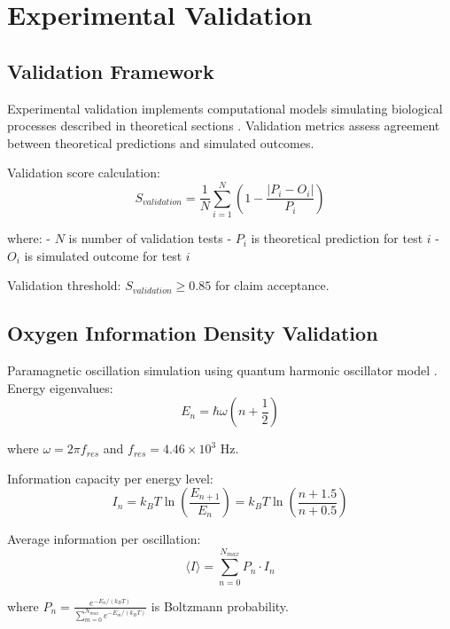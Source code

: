 
\section{Experimental Validation}

\subsection{Validation Framework}

Experimental validation implements computational models simulating biological processes described in theoretical sections \cite{saltelli2008global}. Validation metrics assess agreement between theoretical predictions and simulated outcomes.

Validation score calculation:
\begin{equation}
S_{validation} = \frac{1}{N} \sum_{i=1}^N \left(1 - \frac{|P_i - O_i|}{P_i}\right)
\end{equation}

where:
- $N$ is number of validation tests
- $P_i$ is theoretical prediction for test $i$
- $O_i$ is simulated outcome for test $i$

Validation threshold: $S_{validation} \geq 0.85$ for claim acceptance.

\subsection{Oxygen Information Density Validation}

Paramagnetic oscillation simulation using quantum harmonic oscillator model \cite{griffiths2004introduction}. Energy eigenvalues:
\begin{equation}
E_n = \hbar \omega \left(n + \frac{1}{2}\right)
\end{equation}

where $\omega = 2\pi f_{res}$ and $f_{res} = 4.46 \times 10^3$ Hz.

Information capacity per energy level:
\begin{equation}
I_n = k_B T \ln\left(\frac{E_{n+1}}{E_n}\right) = k_B T \ln\left(\frac{n+1.5}{n+0.5}\right)
\end{equation}

Average information per oscillation:
\begin{equation}
\langle I \rangle = \sum_{n=0}^{N_{max}} P_n \cdot I_n
\end{equation}

where $P_n = \frac{e^{-E_n/(k_B T)}}{\sum_{m=0}^{N_{max}} e^{-E_m/(k_B T)}}$ is Boltzmann probability.

